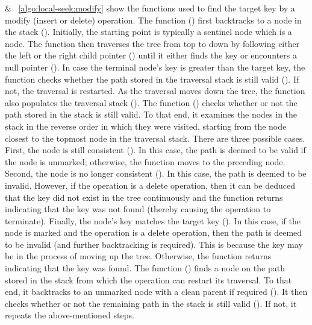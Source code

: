  $\&$ ~\ref{algo:local-seek:modify} show the functions used to find the target key by a modify (insert or delete) operation. The function \SeekForModify{} () first backtracks to a \mysafe{} node in the stack (). Initially, the starting point is typically a sentinel node which is a \mysafe{} node. The function then traverses the tree from top to down by following either the left or the right child pointer () until it either finds the key or encounters a null pointer (). In case the terminal node's key is greater than the target key, the function checks whether the path stored in the traversal stack is still valid (). If not, the traversal is restarted. As the traversal moves down the tree, the function also populates the traversal stack (). The function \FindAdmissible{} () checks whether or not the path stored in the stack is still valid. To that end, it examines  the \myanchor{} nodes in the stack in the reverse order in which they were visited, starting from the \myanchor{} node closest to the topmost node in the traversal stack. There are three possible cases. First, the \myanchor{} node is still consistent (). In this case, the path is deemed to be valid if the \myanchor{} node is unmarked; otherwise, the function moves to the preceding \myanchor{} node. Second, the \myanchor{} node is no longer consistent (). In this case, the path is deemed to be invalid. However, if the operation is a delete operation, then it can be deduced that the key did not exist in the tree  continuously and the function returns indicating that the key was not found (thereby causing the operation to terminate). Finally, the \myanchor{} node's key matches the target key (). In this case, if the \myanchor{} node is marked and the operation is a delete operation, then the path is deemed to be invalid (and further backtracking is required). This is because the key may be in the process of moving up the tree. Otherwise, the function returns indicating that the key was found. The function \FindStartPoint{} () finds a \mysafe{} node on the path stored in the stack from which the operation can restart its traversal. To that end, it backtracks to an unmarked node with a clean parent if required (). It then checks whether or not the remaining path in the stack is still valid (). If not, it repeats the above-mentioned steps.
